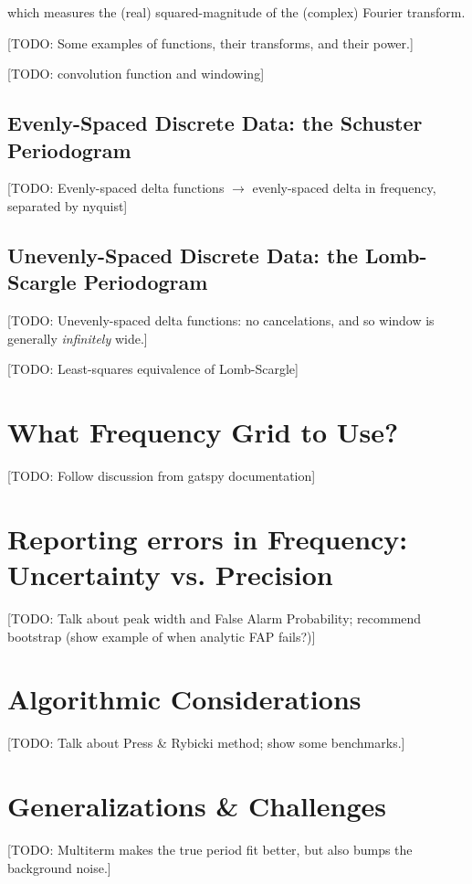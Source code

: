 \documentclass[preprint]{aastex}
\newcommand{\todo}[1]{{\color{red} [TODO: #1]}}
\begin{document}
which measures the (real) squared-magnitude of the (complex) Fourier transform.

\todo{Some examples of functions, their transforms, and their power.}

\todo{convolution function and windowing}


\subsection{Evenly-Spaced Discrete Data: the Schuster Periodogram}

\todo{Evenly-spaced delta functions $\to$ evenly-spaced delta in frequency, separated by nyquist}

\subsection{Unevenly-Spaced Discrete Data: the Lomb-Scargle Periodogram}

\todo{Unevenly-spaced delta functions: no cancelations, and so window is generally {\it infinitely} wide.}

\todo{Least-squares equivalence of Lomb-Scargle}

\section{What Frequency Grid to Use?}

\todo{Follow discussion from gatspy documentation}

\section{Reporting errors in Frequency: Uncertainty vs. Precision}

\todo{Talk about peak width and False Alarm Probability; recommend bootstrap (show example of when analytic FAP fails?)}

\section{Algorithmic Considerations}

\todo{Talk about Press \& Rybicki method; show some benchmarks.}

\section{Generalizations \& Challenges}

\todo{Multiterm makes the true period fit better, but also bumps the background noise.}

\citet{VanderPlas2015}



\end{document}
